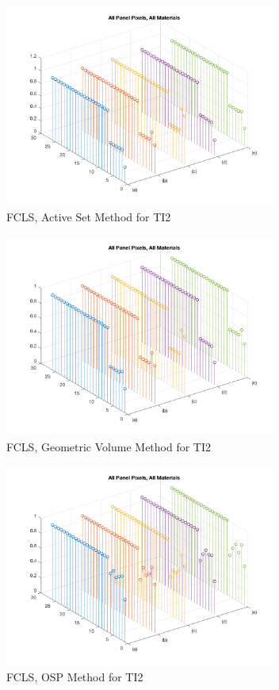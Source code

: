 \documentclass[journal]{IEEEtran}
\begin{document}
\begin{figure}[!h]
    \centering
    \includegraphics[width=3.5in]{fcls_ti2_allmaterials.png}
    \caption{FCLS, Active Set Method for TI2}
    \label{fig:fcls_ti2}
\end{figure}

\begin{figure}[!h]
    \centering
    \includegraphics[width=3.5in]{gfcls_ti2_allmaterials.png}
    \caption{FCLS, Geometric Volume Method for TI2}
    \label{fig:gfcls_ti2}
\end{figure}

\begin{figure}[!h]
    \centering
    \includegraphics[width=3.5in]{osp_fcls_ti2_allmaterials.png}
    \caption{FCLS, OSP Method for TI2}
    \label{fig:osp_fcls_ti2}
\end{figure}
\end{document}
